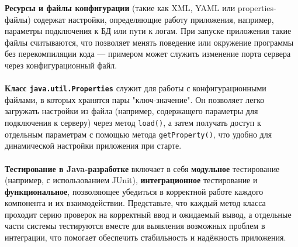 \documentclass[a4paper, 12pt]{report}
\numberwithin{equation}{section}
\begin{document}
	\textbf{Ресурсы и файлы конфигурации} (такие как XML, YAML или properties-файлы) содержат настройки, определяющие работу приложения, например, параметры подключения к БД или пути к логам. При запуске приложения такие файлы считываются, что позволяет менять поведение или окружение программы без перекомпиляции кода — примером может служить изменение порта сервера через конфигурационный файл.
	\\\\
	\textbf{Класс {\tt java.util.Properties}} служит для работы с конфигурационными файлами, в которых хранятся пары "ключ-значение". Он позволяет легко загружать настройки из файла (например, содержащего параметры для подключения к серверу) через метод {\tt load()}, а затем получать доступ к отдельным параметрам с помощью метода {\tt getProperty()}, что удобно для динамической настройки приложения при старте.
	\\\\
	\textbf{Тестирование в Java-разработке} включает в себя \textbf{модульное} тестирование (например, с использованием JUnit), \textbf{интеграционное} тестирование и \textbf{функциональное}, позволяющее убедиться в корректной работе каждого компонента и их взаимодействии. Представьте, что каждый метод класса проходит серию проверок на корректный ввод и ожидаемый вывод, а отдельные части системы тестируются вместе для выявления возможных проблем в интеграции, что помогает обеспечить стабильность и надёжность приложения.
	
\end{document}
